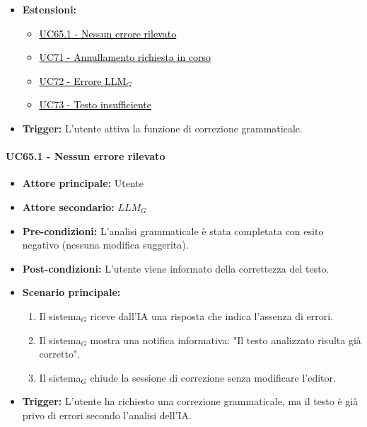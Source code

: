 \documentclass[a4paper, 10pt]{article}
\newcommand{\uclink}[2]{\hyperlink{#1}{\textcolor{black}{\underline{#2}}}}
\begin{document}
\begin{itemize}
\begin{itemize}
            \item Errore di connessione o del servizio esterno → Vedi \uclink{uc:72}{UC72}
            \item Il testo da correggere è troppo breve → Vedi \uclink{uc:73}{UC73}.
        \end{itemize}
    \item \textbf{Estensioni:}
        \begin{itemize}
            \item \uclink{uc:65.1}{UC65.1 - Nessun errore rilevato}
            \item \uclink{uc:71}{UC71 - Annullamento richiesta in corso}
            \item \uclink{uc:72}{UC72 - Errore LLM$_G$}
            \item \uclink{uc:73}{UC73 - Testo insufficiente}
        \end{itemize}
    \item \textbf{Trigger:} L'utente attiva la funzione di correzione grammaticale.
\end{itemize}

\paragraph{UC65.1 - Nessun errore rilevato}
\hypertarget{uc:65.1}{}
\begin{itemize}
    \item \textbf{Attore principale:} Utente
    \item \textbf{Attore secondario:} $LLM_G$
    \item \textbf{Pre-condizioni:} L'analisi grammaticale è stata completata con esito negativo (nessuna modifica suggerita).
    \item \textbf{Post-condizioni:} L'utente viene informato della correttezza del testo.
    \item \textbf{Scenario principale:}
        \begin{enumerate}
            \item Il sistema$_G$ riceve dall'IA una risposta che indica l'assenza di errori.
            \item Il sistema$_G$ mostra una notifica informativa: "Il testo analizzato risulta già corretto".
            \item Il sistema$_G$ chiude la sessione di correzione senza modificare l'editor.
        \end{enumerate}
    \item \textbf{Trigger:} L'utente ha richiesto una correzione grammaticale, ma il testo è già privo di errori secondo l'analisi dell'IA.
\end{itemize}
\end{document}

